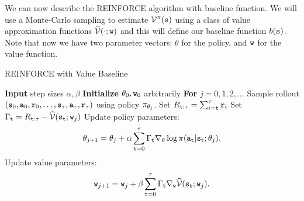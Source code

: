 We can now describe the REINFORCE algorithm with baseline function.
We will use a Monte-Carlo sampling to estimate
$\mathcal{V}^\pi({\tt s})$ using a class of value approximation functions $\widehat{\mathcal{V}}(\cdot;{\tt w})$ and this will define our baseline function
$b({\tt s})$. Note that now we have two parameter vectors: $\theta$ for the policy, and ${\tt w}$ for the value function.

\begin{algorithm}[H]
\caption{REINFORCE with Value Baseline}
\begin{algorithmic}[1]
\State \textbf{Input} step sizes $\alpha,\beta$
\State \textbf{Initialize} $\theta_0, {\tt w}_0$ arbitrarily
\State \textbf{For} $j = 0,1,2,\dots$
\State \quad Sample rollout $({\tt s}_0, {\tt a}_0, {\tt r}_0, \ldots, {\tt s}_\tau, {\tt a}_\tau, {\tt r}_\tau)$ using policy $\pi_{\theta_j}$.
\State \quad Set $R_{{\tt t}:\tau} = \sum_{i={\tt t}}^\tau {\tt r}_i$
\State \quad Set $\Gamma_{\tt t} = R_{{\tt t}:\tau}-\widehat{\mathcal{V}}({\tt s}_{\tt t};{\tt w}_j)$
\State \quad Update policy parameters:
\[
\theta_{j+1} = \theta_j + \alpha \sum_{{\tt t}=0}^{\tau} \Gamma_{\tt t} \nabla_\theta \log \pi({\tt a}_{\tt t} | {\tt s}_{\tt t}; \theta_j).
\]
\State \quad Update value parameters:
\[
{\tt w}_{j+1} = {\tt w}_j + \beta \sum_{{\tt t}=0}^{\tau} \Gamma_{\tt t} \nabla_{{\tt w}} \widehat{\mathcal{V}}({\tt s}_{\tt t};{\tt w}_j).
\]
\end{algorithmic}
\end{algorithm}


